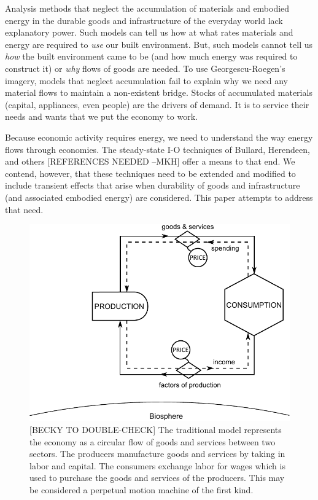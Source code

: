 Analysis methods that neglect the accumulation of materials and embodied energy in the durable goods and infrastructure of the everyday world lack explanatory power. Such models can tell us how at what rates materials and energy are required to \emph{use} our built environment. But, such models cannot tell us \emph{how} the built environment came to be (and how much energy was required to construct it) or \emph{why} flows of goods are needed. To use Georgescu-Roegen's imagery, models that neglect accumulation fail to explain why we need any material flows to maintain a non-existent bridge. Stocks of accumulated materials (capital, appliances, even people) are the drivers of demand. It is to service their needs and wants that we put the economy to work. %

Because economic activity requires energy, we need to understand the way energy flows through economies. The steady-state I-O techniques of Bullard, Herendeen, and others\cite{Bullard1975,Herendeen1978} [REFERENCES NEEDED --MKH] offer a means to that end. We contend, however, that these techniques need to be extended and modified to include transient effects that arise when durability of goods and infrastructure (and associated embodied energy) are considered. This paper attempts to address that need.

\begin{figure}[h!]
\centering
\includegraphics[width=\linewidth]{Part_0/Chapter_Introduction/images/Perpetual_motion_1.pdf}
\caption{[BECKY TO DOUBLE-CHECK] The traditional model represents the economy as a circular flow of goods and services between two sectors. The producers manufacture goods and services by taking in labor and capital. The consumers exchange labor for wages which is used to purchase the goods and services of the producers. This may be considered a perpetual motion machine of the first kind.}
\end{figure}

